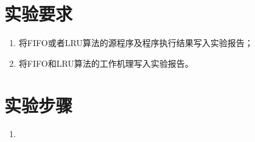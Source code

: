 \documentclass[c5size,a4paper,nofonts]{ctexart}
\begin{document}
\section{实验要求}
\begin{enumerate}[label={(\arabic*)}]
\item 将FIFO或者LRU算法的源程序及程序执行结果写入实验报告；
\item 将FIFO和LRU算法的工作机理写入实验报告。
\end{enumerate}


\section{实验步骤}

\begin{enumerate}

\item %










\end{enumerate}
\end{document}
